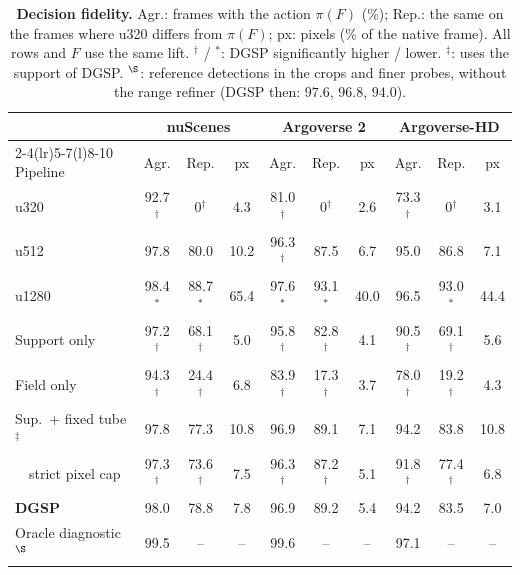 \documentclass[10pt,twocolumn,letterpaper]{article}
\newcommand{\method}{DGSP\xspace}
\newcommand{\full}{F}             %
\newcommand{\policy}{\pi}         %
\theoremstyle{definition}
\theoremstyle{remark}
\newcommand{\oursrow}{\rowcolor{oursbg}}
\newcommand{\na}{--}
\begin{document}
\begin{table}[t]
\centering
\caption{\textbf{Decision fidelity.} Agr.: frames with the action $\policy(\full)$ (\%); Rep.: the same on the frames where u320 differs from $\policy(\full)$; px: pixels (\% of the native frame). All rows and $\full$ use the same lift. $^{\dagger}$ / $^{\ast}$: \method significantly higher / lower. $^{\ddagger}$: uses the support of \method. $^{\S}$: reference detections in the crops and finer probes, without the range refiner (\method then: $97.6$, $96.8$, $94.0$).}
\label{tab:fid}
\scriptsize
\setlength{\tabcolsep}{1.3pt}
\begin{tabular}{@{}lccccccccc@{}}
\toprule
 & \multicolumn{3}{c}{nuScenes} & \multicolumn{3}{c}{Argoverse 2} & \multicolumn{3}{c}{Argoverse-HD} \\
\cmidrule(lr){2-4}\cmidrule(lr){5-7}\cmidrule(l){8-10}
Pipeline & Agr. & Rep. & px & Agr. & Rep. & px & Agr. & Rep. & px \\
\midrule
u320 & 92.7$^{\dagger}$ & 0$^{\dagger}$ & 4.3 & 81.0$^{\dagger}$ & 0$^{\dagger}$ & 2.6 & 73.3$^{\dagger}$ & 0$^{\dagger}$ & 3.1 \\
u512 & 97.8 & 80.0 & 10.2 & 96.3$^{\dagger}$ & 87.5 & 6.7 & 95.0 & 86.8 & 7.1 \\
u1280 & 98.4$^{\ast}$ & 88.7$^{\ast}$ & 65.4 & 97.6$^{\ast}$ & 93.1$^{\ast}$ & 40.0 & 96.5 & 93.0$^{\ast}$ & 44.4 \\
\midrule
Support only & 97.2$^{\dagger}$ & 68.1$^{\dagger}$ & 5.0 & 95.8$^{\dagger}$ & 82.8$^{\dagger}$ & 4.1 & 90.5$^{\dagger}$ & 69.1$^{\dagger}$ & 5.6 \\
Field only & 94.3$^{\dagger}$ & 24.4$^{\dagger}$ & 6.8 & 83.9$^{\dagger}$ & 17.3$^{\dagger}$ & 3.7 & 78.0$^{\dagger}$ & 19.2$^{\dagger}$ & 4.3 \\
Sup.\ + fixed tube$^{\ddagger}$ & 97.8 & 77.3 & 10.8 & 96.9 & 89.1 & 7.1 & 94.2 & 83.8 & 10.8 \\
\ \ strict pixel cap & 97.3$^{\dagger}$ & 73.6$^{\dagger}$ & 7.5 & 96.3$^{\dagger}$ & 87.2$^{\dagger}$ & 5.1 & 91.8$^{\dagger}$ & 77.4$^{\dagger}$ & 6.8 \\
\oursrow \textbf{\method} & 98.0 & 78.8 & 7.8 & 96.9 & 89.2 & 5.4 & 94.2 & 83.5 & 7.0 \\
\midrule
Oracle diagnostic$^{\S}$ & 99.5 & \na & \na & 99.6 & \na & \na & 97.1 & \na & \na \\
\bottomrule
\end{tabular}
\end{table}
\end{document}
